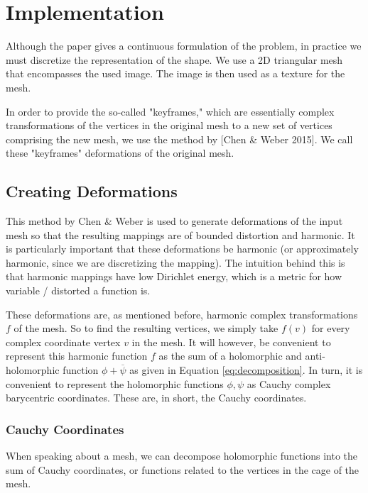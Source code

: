 \section{Implementation}

Although the paper gives a continuous formulation of the problem, in practice we must discretize the representation of the shape. We use a 2D triangular mesh that encompasses the used image. The image is then used as a texture for the mesh. 

In order to provide the so-called "keyframes," which are essentially complex transformations of the vertices in the original mesh to a new set of vertices comprising the new mesh, we use the method by [Chen \& Weber 2015]. We call these "keyframes" deformations of the original mesh. 

\subsection{Creating Deformations}

This method by Chen \& Weber is used to generate deformations of the input mesh so that the resulting mappings are of bounded distortion and harmonic. It is particularly important that these deformations be harmonic (or approximately harmonic, since we are discretizing the mapping). The intuition behind this is that harmonic mappings have low Dirichlet energy, which is a metric for how variable / distorted a function is. %

These deformations are, as mentioned before, harmonic complex transformations $f$ of the mesh. So to find the resulting vertices, we simply take $f(v)$ for every complex coordinate vertex $v$ in the mesh. It will however, be convenient to represent this harmonic function $f$ as the sum of a holomorphic and anti-holomorphic function $\phi + \overline{\psi}$ as given in Equation \ref{eq:decomposition}. In turn, it is convenient to represent the holomorphic functions $\phi, \psi$ as Cauchy complex barycentric coordinates. These are, in short, the Cauchy coordinates.


\subsubsection{Cauchy Coordinates}

When speaking about a mesh, we can decompose holomorphic functions into the sum of Cauchy coordinates, or functions related to the vertices in the cage of the mesh.

